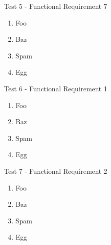 {\sc Test 5 - Functional Requirement 7}

{\em \FRVII}

\begin{enumerate}
\item Foo
\item Baz
\item Spam
\item Egg
\end{enumerate}

{\sc Test 6 - Functional Requirement 1}

{\em \FRI}

\begin{enumerate}
\item Foo
\item Baz
\item Spam
\item Egg
\end{enumerate}

{\sc Test 7 - Functional Requirement 2}

{\em \FRII}

\begin{enumerate}
\item Foo
\item Baz
\item Spam
\item Egg
\end{enumerate}
